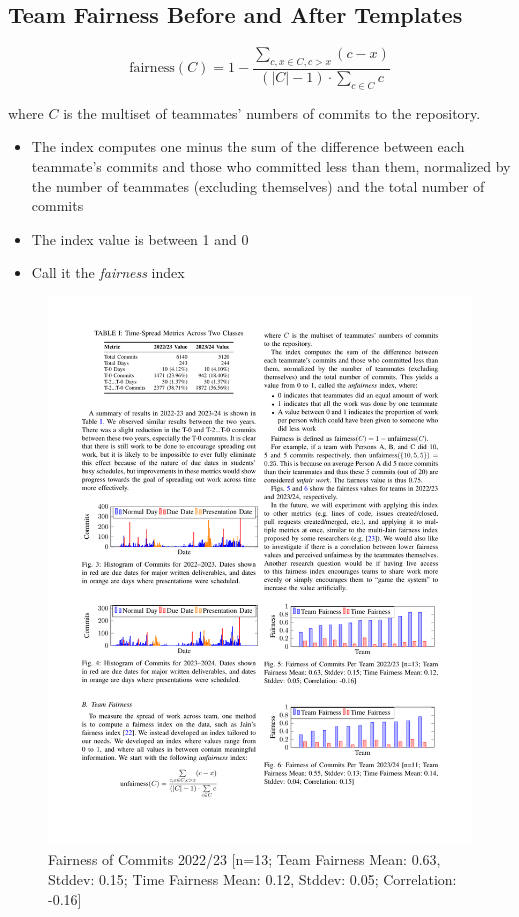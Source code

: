 \documentclass[poster, a0, plainboxedsections]{sciposter}
\begin{document}
\begin{multicols}{2}
\section*{Team Fairness Before and After Templates}

$$
\text{fairness}(C) = 1 - \frac{ \sum\limits_{c, x \in C, c > x} (c-x)}{(\left|C\right| -
1) \cdot \sum\limits_{c \in C} c}
$$

\noindent where $C$ is the multiset of teammates' numbers of commits to the 
repository.

\begin{itemize}
\item The index computes one minus the sum of the difference between each teammate's
commits and those who committed less than them, normalized by the number of
teammates (excluding themselves) and the total number of commits
\item The index value is between 1 and 0
\item Call it the \textit{fairness} index
\end{itemize}

\begin{figure}[h]
\centering
\includegraphics[width=1.0\linewidth]{../figures/FairnessCommits_22_23.pdf}
\caption{Fairness of Commits 2022/23 [n=13; Team Fairness Mean: 0.63, Stddev: 0.15; Time Fairness Mean: 0.12, Stddev: 0.05; Correlation: -0.16]}\label{Fig:Fairness2022/23}
\end{figure}


\end{multicols}
\end{document}
